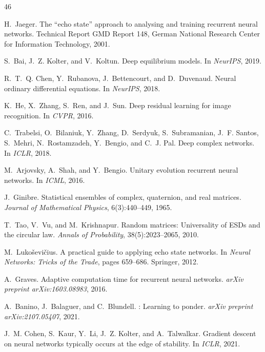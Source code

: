 \documentclass{article}
\theoremstyle{remark}
\begin{document}
\begin{thebibliography}{46}

H.~Jaeger.
\newblock The ``echo state'' approach to analysing and training recurrent neural
  networks.
\newblock Technical Report GMD Report 148, German National Research Center for
  Information Technology, 2001.

S.~Bai, J.~Z. Kolter, and V.~Koltun.
\newblock Deep equilibrium models.
\newblock In \emph{NeurIPS}, 2019.

R.~T.~Q. Chen, Y.~Rubanova, J.~Bettencourt, and D.~Duvenaud.
\newblock Neural ordinary differential equations.
\newblock In \emph{NeurIPS}, 2018.

K.~He, X.~Zhang, S.~Ren, and J.~Sun.
\newblock Deep residual learning for image recognition.
\newblock In \emph{CVPR}, 2016.

C.~Trabelsi, O.~Bilaniuk, Y.~Zhang, D.~Serdyuk, S.~Subramanian, J.~F. Santos,
  S.~Mehri, N.~Rostamzadeh, Y.~Bengio, and C.~J. Pal.
\newblock Deep complex networks.
\newblock In \emph{ICLR}, 2018.

M.~Arjovsky, A.~Shah, and Y.~Bengio.
\newblock Unitary evolution recurrent neural networks.
\newblock In \emph{ICML}, 2016.

J.~Ginibre.
\newblock Statistical ensembles of complex, quaternion, and real matrices.
\newblock \emph{Journal of Mathematical Physics}, 6(3):440--449, 1965.

T.~Tao, V.~Vu, and M.~Krishnapur.
\newblock Random matrices: Universality of {ESDs} and the circular law.
\newblock \emph{Annals of Probability}, 38(5):2023--2065, 2010.

M.~Luko{\v{s}}evi{\v{c}}ius.
\newblock A practical guide to applying echo state networks.
\newblock In \emph{Neural Networks: Tricks of the Trade}, pages 659--686.
  Springer, 2012.

A.~Graves.
\newblock Adaptive computation time for recurrent neural networks.
\newblock \emph{arXiv preprint arXiv:1603.08983}, 2016.

A.~Banino, J.~Balaguer, and C.~Blundell.
: Learning to ponder.
\newblock \emph{arXiv preprint arXiv:2107.05407}, 2021.

J.~M. Cohen, S.~Kaur, Y.~Li, J.~Z. Kolter, and A.~Talwalkar.
\newblock Gradient descent on neural networks typically occurs at the edge of
  stability.
\newblock In \emph{ICLR}, 2021.


\end{thebibliography}
\end{document}
